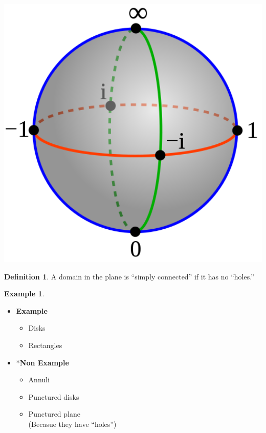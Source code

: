 \documentclass[
]{book}
\providecommand{\tightlist}{%
  \setlength{\itemsep}{0pt}\setlength{\parskip}{0pt}}
\theoremstyle{definition}
\newtheorem{definition}{Definition}[chapter]
\theoremstyle{definition}
\newtheorem{example}{Example}[chapter]
\theoremstyle{definition}
\theoremstyle{definition}
\theoremstyle{remark}
\begin{document}
\begin{center}\includegraphics[width=6.67in,height=0.5\textheight]{figures/Mario_Bonk/fig2} \end{center}

\begin{definition}
\protect\hypertarget{def:unnamed-chunk-28}{}\label{def:unnamed-chunk-28}A domain in the plane is ``simply connected'' if it has no ``holes.''
\end{definition}

\begin{example}
\protect\hypertarget{exm:unnamed-chunk-29}{}\label{exm:unnamed-chunk-29}\leavevmode

\begin{itemize}
\tightlist
\item
  \textbf{Example}

  \begin{itemize}
  \tightlist
  \item
    Disks
  \item
    Rectangles
  \end{itemize}
\item
  *\textbf{Non Example}

  \begin{itemize}
  \tightlist
  \item
    Annuli
  \item
    Punctured disks
  \item
    Punctured plane\\
    (Becasue they have ``holes'')
  \end{itemize}
\end{itemize}

\end{example}
\end{document}
